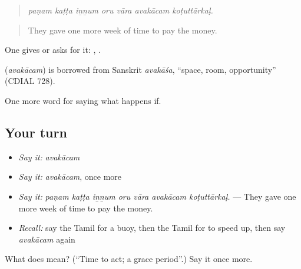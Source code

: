 \begin{quote}
\emph{paṇam kaṭṭa iṉṉum oru vāra avakācam koṭuttārkaḷ.}
\end{quote}

\begin{quote}
They gave one more week of time to pay the money.
\end{quote}

One gives or asks for it:  ,  .

\begin{cousinweb}
\textbf{} (\emph{avakācam}) is borrowed from Sanskrit \emph{avakāśa}, \textquotedblleft{}space, room, opportunity\textquotedblright{} (CDIAL 728).
\end{cousinweb}

\begin{grammarlens}[title={What you've built}]
One more word for saying what happens if.
\end{grammarlens}

\subsection*{Your turn}
\begin{itemize}
\raggedright
  \item \emph{Say it:} \emph{avakācam}
  \item \emph{Say it:} \emph{avakācam}, once more
  \item \emph{Say it:} \emph{paṇam kaṭṭa iṉṉum oru vāra avakācam koṭuttārkaḷ.} — They gave one more week of time to pay the money.
  \item \emph{Recall:} say the Tamil for a buoy, then the Tamil for to speed up, then say \emph{avakācam} again
\end{itemize}

\begin{tcolorbox}[breakable,colback=teal!4,colframe=teal!35!black,title={Before you move on}]
What does  mean? (\textquotedblleft{}Time to act; a grace period\textquotedblright{}.) Say it once more.
\end{tcolorbox}
